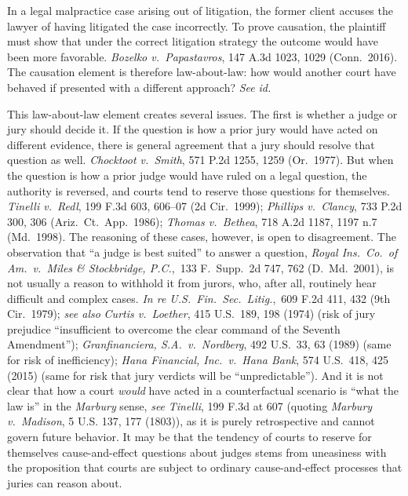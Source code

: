 \documentclass[
  12pt,
  letterpaper,
]{scrartcl}
\begin{document}
In a legal malpractice case arising out of litigation, the former client
accuses the lawyer of having litigated the case incorrectly. To prove
causation, the plaintiff must show that under the correct litigation strategy the
outcome would have been more favorable. \textit{Bozelko v.~Papastavros}, 147
A.3d 1023, 1029 (Conn.~2016). The causation element is therefore law-about-law:
how would another court have behaved if presented with a different approach? \textit{See} \textit{id.}

This law-about-law element creates several issues. The first is whether a judge
or jury should decide it. If the question is how a prior jury would have acted
on different evidence, there is general agreement that a jury should resolve
that question as well. \textit{Chocktoot v.~Smith}, 571 P.2d 1255, 1259
(Or.~1977). But when the question is how a prior judge would have ruled on a legal
question, the authority is reversed, and courts tend to reserve those questions
for themselves. \textit{Tinelli v.~Redl}, 199 F.3d 603, 606--07 (2d Cir.~1999);
\textit{Phillips v.~Clancy}, 733 P.2d 300, 306 (Ariz.~Ct.~App.~1986);
\textit{Thomas v.~Bethea}, 718 A.2d 1187, 1197 n.7 (Md.~1998). The reasoning of
these cases, however, is open to disagreement. The observation that ``a judge
is best suited'' to answer a question, \textit{Royal Ins.~Co.~of
Am.~v.~Miles \& Stockbridge, P.C.},~133 F.~Supp.~2d 747, 762 (D.~Md.~2001), is
not usually a reason to withhold it from jurors, who, after all,
routinely hear difficult and complex cases. \textit{In re
U.S.~Fin.~Sec.~Litig.},~609 F.2d 411, 432 (9th Cir.~1979); \textit{see also}
\textit{Curtis v.~Loether}, 415 U.S.~189, 198 (1974) (risk of jury prejudice
``insufficient to overcome the clear command of the Seventh Amendment'');
\textit{Granfinanciera, S.A.~v.~Nordberg}, 492 U.S.~33, 63 (1989) (same for
risk of inefficiency); \textit{Hana Financial, Inc.~v.~Hana Bank}, 574
U.S.~418, 425 (2015) (same for risk that jury verdicts will be
``unpredictable''). And it is not clear that how a court \emph{would} have
acted in a counterfactual scenario is ``what the law is'' in the
\textit{Marbury} sense, \textit{see} \textit{Tinelli}, 199 F.3d at 607 (quoting
\textit{Marbury v.~Madison}, 5 U.S. 137, 177 (1803)), as it is purely
retrospective and cannot govern future behavior. It may be
that the tendency of courts to reserve for themselves cause-and-effect
questions about judges stems from uneasiness with the proposition that courts
are subject to ordinary cause-and-effect processes that juries can reason
about.
\end{document}
